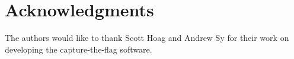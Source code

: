 \documentclass[letterpaper, 10 pt, conference]{ieeeconf}  %
\numberwithin{algorithm}{section}
\begin{document}
\section*{Acknowledgments}
The authors would like to thank Scott Hoag and Andrew Sy for their work on developing the capture-the-flag software.


\vspace{-5mm}



\end{document}
